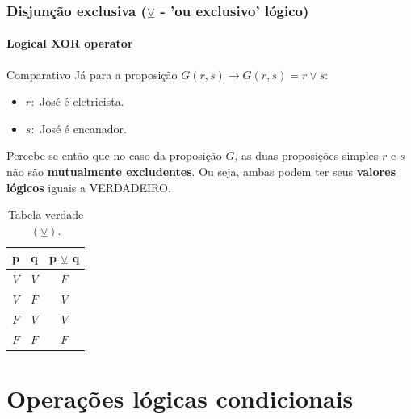 \documentclass[10pt, headsepline, captions=tableabove, xcolor=table]{beamer}
\begin{document}
\begin{frame}[t]
    \frametitle{Disjunção exclusiva ($\veebar$ - 'ou exclusivo' lógico)}
    \framesubtitle{Logical XOR operator}
    \vspace{-2mm}
    \begin{block}{Comparativo}
        Já para a proposição $G(r,s) \longrightarrow G(r,s) = r \lor s $:
        \begin{itemize}
            \item[] $r:$ José é eletricista.
            \item[] $s:$ José é encanador.
        \end{itemize}
        Percebe-se então que no caso da proposição $G$, as duas proposições simples $r$ e $s$ não são \textbf{mutualmente excludentes}. Ou seja, ambas podem ter seus \textbf{valores lógicos} iguais a VERDADEIRO. \\[2pt]
    \end{block}
    \vspace{-5mm}
    \begin{table}[ht]
        \caption{Tabela verdade $(\veebar)$.}
        \label{tab:tabela-xor}
        \begin{tabular}{|c|c|c|}
        \hline
        \rowcolor[HTML]{EFEFEF} 
        \textbf{p} & \textbf{q} & \textbf{p $\veebar$ q} \\ \hline
        $V$        & $V$        & $F$                    \\ \hline
        $V$        & $F$        & $V$                    \\ \hline
        $F$        & $V$        & $V$                    \\ \hline
        $F$        & $F$        & $F$                    \\ \hline
        \end{tabular}
    \end{table}
\end{frame}
%
%
\section{Operações lógicas condicionais}
%
\end{document}
